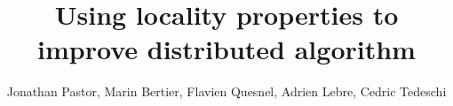 \documentclass[runningheads,a4paper]{llncs2e/llncs}
\begin{document}
\mainmatter  %

\title{Using locality properties to improve distributed algorithm}

%
%
\author{Jonathan Pastor, Marin Bertier, Flavien Quesnel, Adrien Lebre, Cedric Tedeschi}
%


\maketitle















%
%
%
%
%
%
%

%
%

%
\end{document}
